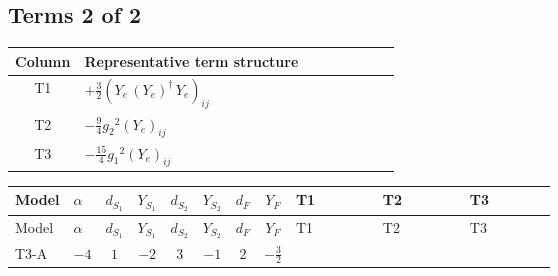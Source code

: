 \documentclass[8pt]{article}
\begin{document}
\begin{landscape}
\subsection*{Terms 2 of 2}
\begin{center}
\begin{tabular}{@{}c >{\raggedright\arraybackslash}p{0.82\linewidth}@{}}
\toprule
Column & Representative term structure \\
\midrule
T1 & \(\displaystyle +\frac{3}{2} \left({Y_e}\,\left({Y_e}\right)^{\dagger}\,{Y_e}\right)_{ij}\) \\
\midrule
T2 & \(\displaystyle -\frac{9}{4} {g_2}^2 \left({Y_e}\right)_{ij}\) \\
\midrule
T3 & \(\displaystyle -\frac{15}{4} {g_1}^2 \left({Y_e}\right)_{ij}\) \\
\midrule
\bottomrule
\end{tabular}
\end{center}
\smallskip
\tiny
\begin{longtable}{@{}llcccccc >{\raggedright\arraybackslash}p{0.21\linewidth} >{\raggedright\arraybackslash}p{0.21\linewidth} >{\raggedright\arraybackslash}p{0.21\linewidth}@{}}
\toprule
Model & $\alpha$ & $d_{S_1}$ & $Y_{S_1}$ & $d_{S_2}$ & $Y_{S_2}$ & $d_F$ & $Y_F$ & T1 & T2 & T3 \\
\midrule
\endfirsthead
\toprule
Model & $\alpha$ & $d_{S_1}$ & $Y_{S_1}$ & $d_{S_2}$ & $Y_{S_2}$ & $d_F$ & $Y_F$ & T1 & T2 & T3 \\
\midrule
\endhead
T3-A & $-4$ & $1$ & $-2$ & $3$ & $-1$ & $2$ & $-\frac{3}{2}$ & \scriptsize\adjustbox{max width=\linewidth}{$\begin{gathered} +\frac{3}{2} \left({Y_e}\,\left({Y_e}\right)^{\dagger}\,{Y_e}\right)_{ij}\end{gathered}$} & \scriptsize\adjustbox{max width=\linewidth}{$\begin{gathered} -\frac{9}{4} {g_2}^2 \left({Y_e}\right)_{ij}\end{gathered}$} & \scriptsize\adjustbox{max width=\linewidth}{$\begin{gathered} -\frac{15}{4} {g_1}^2 \left({Y_e}\right)_{ij}\end{gathered}$} \\
\midrule
\bottomrule
\end{longtable}
\clearpage

\end{landscape}
\end{document}
